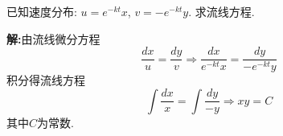 \begin{problem}[问题2.2]
已知速度分布: $u=e^{-kt}x$, $v=-e^{-kt}y$. 求流线方程.
\end{problem}
\begin{solution}
\textbf{解:}由流线微分方程
\[
\frac{dx}{u} = \frac{dy}{v} \Longrightarrow \frac{dx}{e^{-kt}x} = \frac{dy}{-e^{-kt}y}
\]
积分得流线方程
\[
\int \frac{dx}{x} = \int \frac{dy}{-y} \Longrightarrow  xy = C
\]
其中$C$为常数.
\end{solution}

